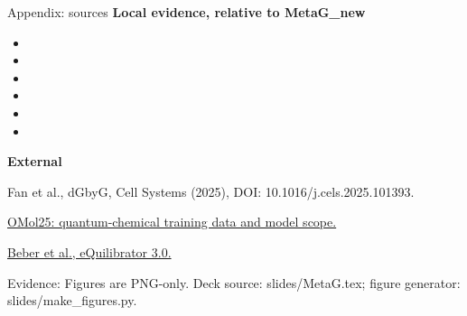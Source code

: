 \documentclass[aspectratio=169,11pt]{beamer}
\newcommand{\src}[1]{\vfill{\tiny\color{muted}Evidence: #1\par}}
\newcommand{\gap}{\vspace{.18cm}}
\begin{document}
\begin{frame}{Appendix: sources}
\small
\textbf{Local evidence, relative to MetaG\_new}\gap
\begin{itemize}\item {}\item {}\item {}\item {}\item {}\item {}\end{itemize}
\gap
\textbf{External}\par\scriptsize
Fan et al., dGbyG, Cell Systems (2025), DOI: 10.1016/j.cels.2025.101393.\par
\href{https://arxiv.org/abs/2505.08762}{OMol25: quantum-chemical training data and model scope.}\par
\href{https://doi.org/10.1093/nar/gkab1106}{Beber et al., eQuilibrator 3.0.}
\src{Figures are PNG-only. Deck source: slides/MetaG.tex; figure generator: slides/make\_figures.py.}
\end{frame}
\end{document}
